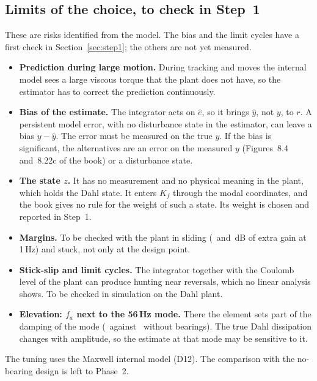 \documentclass[10pt,a4paper]{article}
\numberwithin{equation}{section}
\begin{document}
\subsection{Limits of the choice, to check in Step~1}\label{sec:limits}
These are risks identified from the model. The bias and the limit cycles have a first check in Section~\ref{sec:step1}; the others are not yet measured.
\begin{itemize}
\item \textbf{Prediction during large motion.} During tracking and moves the internal model sees a large viscous torque that the plant does not have, so the estimator has to correct the prediction continuously.
\item \textbf{Bias of the estimate.} The integrator acts on $\hat e$, so it brings $\hat y$, not $y$, to $r$. A persistent model error, with no disturbance state in the estimator, can leave a bias $y-\hat y$. The error must be measured on the true $y$. If the bias is significant, the alternatives are an error on the measured $y$ (Figures~8.4 and~8.22c of the book) or a disturbance state.
\item \textbf{The state $z$.} It has no measurement and no physical meaning in the plant, which holds the Dahl state. It enters $K_f$ through the modal coordinates, and the book gives no rule for the weight of such a state. Its weight is chosen and reported in Step~1.
\item \textbf{Margins.} To be checked with the plant in sliding (\gapSA\ and \gapSP\,dB of extra gain at 1\,Hz) and stuck, not only at the design point.
\item \textbf{Stick-slip and limit cycles.} The integrator together with the Coulomb level of the plant can produce hunting near reversals, which no linear analysis shows. To be checked in simulation on the Dahl plant.
\item \textbf{Elevation: $f_a$ next to the 56\,Hz mode.} There the element sets part of the damping of the mode (\zMP\ against \zNP\ without bearings). The true Dahl dissipation changes with amplitude, so the estimate at that mode may be sensitive to it.
\end{itemize}
The tuning uses the Maxwell internal model (D12). The comparison with the no-bearing design is left to Phase~2.
\end{document}
